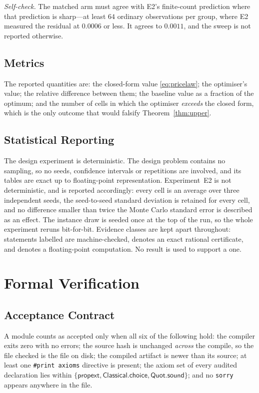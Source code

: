 \emph{Self-check.} The matched arm must agree with E2's finite-count prediction where that
prediction is sharp---at least $64$ ordinary observations per group, where E2 measured the
residual at $0.0006$ or less. It agrees to $0.0011$, and the sweep is not reported otherwise.

\subsection{Metrics}

The reported quantities are: the closed-form value \eqref{eq:pricelaw}; the optimiser's
value; the relative difference between them; the baseline value as a fraction of the
optimum; and the number of cells in which the optimiser \emph{exceeds} the closed form,
which is the only outcome that would falsify Theorem~\ref{thm:upper}.

\subsection{Statistical Reporting}

The design experiment is deterministic. The design problem contains no sampling, so no seeds,
confidence intervals or repetitions are involved, and its tables are exact up to
floating-point representation. Experiment~E2 is not deterministic, and is reported
accordingly: every cell is an average over three independent seeds, the seed-to-seed standard
deviation is retained for every cell, and no difference smaller than twice the Monte Carlo
standard error is described as an effect. The instance draw is seeded once at the top of the
run, so the whole experiment reruns bit-for-bit. Evidence classes are kept apart throughout: statements
labelled \PROVED{} are machine-checked, \CERT{} denotes an exact rational certificate, and
\NUM{} denotes a floating-point computation. No \NUM{} result is used to support a
\PROVED{} one.

\section{Formal Verification}
\label{sec:verification}

\subsection{Acceptance Contract}

A module counts as accepted only when all six of the following hold: the compiler exits zero
with no errors; the source hash is unchanged \emph{across} the compile, so the file checked is
the file on disk; the compiled artifact is newer than its source; at least one
\texttt{\#print axioms} directive is present; the axiom set of every audited declaration lies
within $\{\textsf{propext},\textsf{Classical.choice},\textsf{Quot.sound}\}$; and no
\texttt{sorry} appears anywhere in the file.

